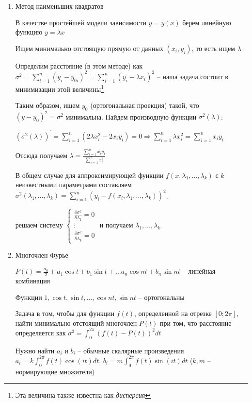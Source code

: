 \documentclass[12pt]{article}
\begin{document}
    \begin{enumerate}
        \item Метод наименьших квадратов

        В качестве простейшей модели зависимости $y = y(x)$ берем линейную функцию $y = \lambda x$

        Ищем минимально отстоящую прямую от данных $(x_i, y_i)$, то есть ищем $\lambda$

        Определим расстояние (в этом методе) как $\sigma^2 = \sum^n_{i=1} (y_i - y_{0i})^2 = \sum^n_{i=1} (y_i - \lambda x_i)^2$ -- наша 
        задача состоит в минимизации этой величины\footnote{Эта величина также известна как \textit{дисперсия}}

        Таким образом, ищем $y_0$ (ортогональная проекция) такой, что $(y - y_0)^2 = \sigma^2$ минимальна. 
        Найдем производную функции $\sigma^2(\lambda)$:

        $\left(\sigma^2(\lambda)\right)^\prime = \sum^n_{i = 1} (2\lambda x_i^2 - 2 x_i y_i) = 0 \Longrightarrow 
        \sum^n_{i = 1} \lambda x_i^2 = \sum^n_{i = 1} x_i y_i$

        Отсюда получаем $\lambda = \frac{\sum_{i = 1}^n x_i y_i}{\sum_{i = 1}^n x_i^2}$

        В общем случае для аппроксимирующей функции $f(x, \lambda_1, \dots, \lambda_k)$ с $k$ неизвестными
        параметрами составляем $\sigma^2(\lambda_1, \dots, \lambda_k) = \sum^n_{i = 1} (y_i - f(x_i, \lambda_1, \dots, \lambda_k))^2$,
        
        решаем систему
        $\begin{cases}
            \frac{\partial \sigma^2}{\partial \lambda_1} = 0 \\
            \vdots \\
            \frac{\partial \sigma^2}{\partial \lambda_k} = 0
        \end{cases}$
        и получаем $\lambda_1, \dots, \lambda_k$

        \item Многочлен Фурье

        $P(t) = \frac{a_0}{2} + a_1 \cos t + b_1 \sin t + \dots a_n \cos nt + b_n \sin nt$ -- линейная комбинация

        Функции ${1, \cos t, \sin t, \dots, \cos nt, \sin nt}$ -- ортогональны

        Задача в том, чтобы для функции $f(t)$, определенной на отрезке $[0;2\pi]$, 
        найти минимально отстоящий многочлен $P(t)$ при том,
        что расстояние определяется как $\sigma^2 = \int_0^{2\pi} (f(t) - P(t))^2 dt$

        Нужно найти $a_i$ и $b_i$ -- обычные скалярные произведения $a_i = k \int_0^{2\pi} f(t) \cos(it) dt$, $\displaystyle b_i = m \int_0^{2\pi} f(t) \sin(it) dt$ ($k, m$ -- нормирующие множители)
    \end{enumerate}
\end{document}
